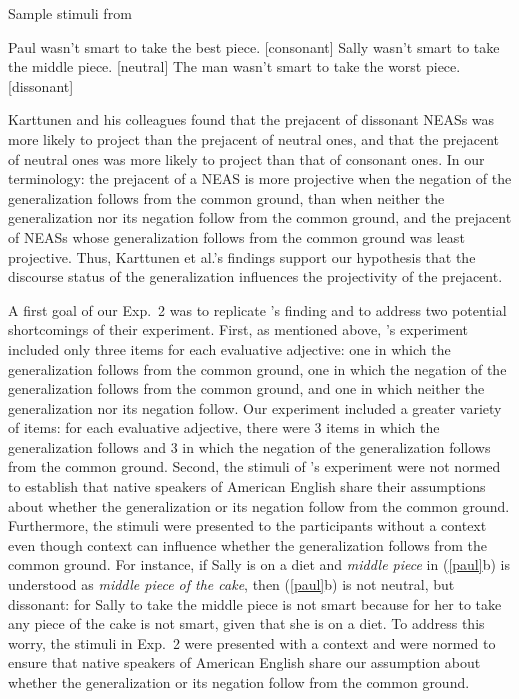 \documentclass[11pt,fleqn]{article}
\newcommand{\6}{\mbox{$[\hspace*{-.6mm}[$}}
\newcommand{\9}{\mbox{$]\hspace*{-.6mm}]$}}
\newcommand{\citepos}[1]{\citeauthor{#1}'s \citeyear{#1}}
\begin{document}
\begin{exe}
\ex\label{paul} Sample stimuli from \citealt[241]{karttunen-etal2014}
\begin{xlist}
\ex Paul wasn't smart to take the best piece. \hfill [consonant]
\ex Sally wasn't smart to take the middle piece.  \hfill [neutral]
\ex The man wasn't smart to take the worst piece. \hfill [dissonant]
\end{xlist}
\end{exe}

Karttunen and his colleagues found that the prejacent of dissonant NEASs was more likely to project than the prejacent of neutral ones, and that the prejacent of neutral ones was more likely to project than that of consonant ones. In our terminology: the prejacent of a NEAS is more projective when the negation of the generalization follows from the common ground, than when neither the generalization nor its negation follow from the common ground, and the prejacent of NEASs whose generalization follows from the common ground was least projective. Thus, Karttunen et al.'s findings support our hypothesis that the discourse status of the generalization influences the projectivity of the prejacent.

A first goal of our Exp.~2 was to replicate \citepos{karttunen-etal2014} finding and to address two potential shortcomings of their experiment. First, as mentioned above, \citepos{karttunen-etal2014} experiment included only three items for each evaluative adjective: one in which the generalization follows from the common ground, one in which the negation of the generalization follows from the common ground, and one in which neither the generalization nor its negation follow. Our experiment included a greater variety of items: for each evaluative adjective, there were 3 items in which the generalization follows and 3 in which the negation of the generalization follows from the common ground. Second, the stimuli of  \citepos{karttunen-etal2014} experiment were not normed to establish that native speakers of American English share their assumptions about whether the generalization or its negation follow from the common ground. Furthermore, the stimuli were
presented to the participants without a context even though context can influence whether the generalization follows from the common ground. For instance, if Sally is on a diet and {\em middle piece} in (\ref{paul}b) is understood as {\em middle piece of the cake}, then (\ref{paul}b) is not neutral, but dissonant: for Sally to take the middle piece is not smart because for her to take any piece of the cake is not smart, given that she is on a diet. To address this worry, the stimuli in Exp.~2 were presented with a context and were normed to ensure that native speakers of American English share our assumption about whether the generalization or its negation follow from the common ground.
\end{document}
